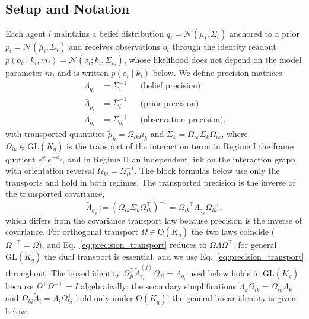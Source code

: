 \subsection{Setup and Notation}

Each agent $i$ maintains a belief distribution $q_i = \mathcal{N}(\mu_i, \Sigma_i)$ anchored to a prior $p_i = \mathcal{N}(\bar{\mu}_i, \bar{\Sigma}_i)$ and receives observations $o_i$ through the identity readout $p(o_i \mid k_i, m_i) = \mathcal{N}(o_i; k_i, \Sigma_{o_i})$, whose likelihood does not depend on the model parameter $m_i$ and is written $p(o_i \mid k_i)$ below. We define precision matrices
\begin{align}
\Lambda_{q_i} &= \Sigma_i^{-1} & &\text{(belief precision)} \\
\bar{\Lambda}_{p_i} &= \bar{\Sigma}_i^{-1} & &\text{(prior precision)} \\
\Lambda_{o_i} &= \Sigma_{o_i}^{-1} & &\text{(observation precision)},
\end{align}
with transported quantities $\tilde{\mu}_k = \Omega_{ik}\mu_k$ and $\tilde{\Sigma}_k = \Omega_{ik}\Sigma_k\Omega_{ik}^\top$, where $\Omega_{ik} \in \mathrm{GL}(K_q)$ is the transport of the interaction term: in Regime I the frame quotient $e^{\phi_i}e^{-\phi_k}$, and in Regime II an independent link on the interaction graph with orientation reversal $\Omega_{ki} = \Omega_{ik}^{-1}$. The block formulas below use only the transports and hold in both regimes. The transported precision is the inverse of the transported covariance,
\begin{equation}
\tilde{\Lambda}_{q_k} := (\Omega_{ik}\Sigma_k\Omega_{ik}^\top)^{-1} = \Omega_{ik}^{-\top}\Lambda_{q_k}\Omega_{ik}^{-1},
\label{eq:precision_transport}
\end{equation}
which differs from the covariance transport law because precision is the inverse of covariance. For orthogonal transport $\Omega \in \mathrm{O}(K_q)$ the two laws coincide ($\Omega^{-\top} = \Omega$), and Eq.~\eqref{eq:precision_transport} reduces to $\Omega\Lambda\Omega^\top$; for general $\mathrm{GL}(K_q)$ the dual transport is essential, and we use Eq.~\eqref{eq:precision_transport} throughout. The boxed identity $\Omega_{ji}^\top \tilde{\Lambda}_{q_i}^{(j)} \Omega_{ji} = \Lambda_{q_i}$ used below holds in $\mathrm{GL}(K_q)$ because $\Omega^\top \Omega^{-\top} = I$ algebraically; the secondary simplifications $\tilde{\Lambda}_k\Omega_{ik} = \Omega_{ik}\Lambda_k$ and $\Omega_{ki}^\top\tilde\Lambda_i = \Lambda_i\Omega_{ki}^\top$ hold only under $\mathrm{O}(K_q)$; the general-linear identity is given below.

